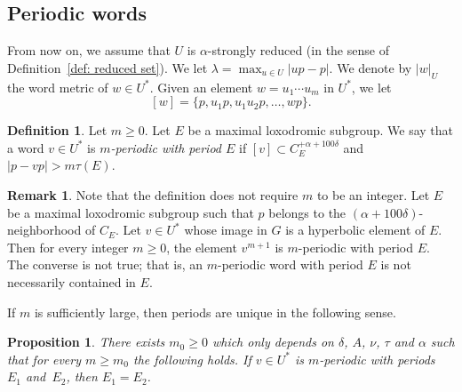 \documentclass[JEP,XML,SOM,Unicode, NoEqCountersInSection,published]{cedram}
\theoremstyle{plain}
\newtheorem{prop}[thm]{Proposition}
\theoremstyle{definition}
\newtheorem{df}[thm]{Definition}
\newtheorem{rem}[thm]{Remark}
\begin{document}
\subsection{Periodic words}
From now on, we assume that $U$ is $\alpha$-strongly reduced (in the sense of Definition~\ref{def: reduced set}).
We let $\lambda = \max_{u\in U}|up-p|$.
We denote by $|w|_U$ the word metric of $w\in U^*$.
Given an element $w = u_1 \cdots u_m$ in $U^*$, we let
\[
[w]=\{p, u_1p,u_1u_2p,\ldots, wp\}.
\]

\begin{df}\label{D: periodic}
Let $m \geq 0$.
Let $E$ be a maximal loxodromic subgroup.
We say that a word $v\in U^*$ is \emph{$m$-periodic with period $E$} if $[v]\subset C_{E}^{+\alpha + 100\delta}$ and $|p-vp| > m \tau(E).$
\end{df}

\begin{rem}
Note that the definition does not require $m$ to be an integer.
Let $E$ be a maximal loxodromic subgroup such that $p$ belongs to the $(\alpha + 100\delta)$-neighborhood of $C_E$.
Let $v \in U^*$ whose image in $G$ is a hyperbolic element of $E$.
Then for every integer $m\geq0$,
the element $v^{m+1}$ is $m$-periodic with period $E$.
The converse is not true; that is, an $m$-periodic word with period $E$ is not necessarily contained in $E$.
\end{rem}

If $m$ is sufficiently large, then periods are unique in the following sense.

\begin{prop}
\label{res: unicity period}
There exists $m_0 \geq 0$ which only depends on $\delta$, $A$, $\nu$, $\tau$ and $\alpha$ such that for every $m \geq m_0$ the following holds.
If $v \in U^*$ is $m$-periodic with periods~$E_1$ and~$E_2$, then $E_1=E_2$.
\end{prop}
\end{document}

